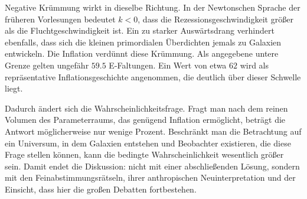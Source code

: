 Negative Krümmung wirkt in dieselbe Richtung. In der Newtonschen Sprache der früheren Vorlesungen bedeutet \(k<0\), dass die Rezessionsgeschwindigkeit größer als die Fluchtgeschwindigkeit ist. Ein zu starker Auswärtsdrang verhindert ebenfalls, dass sich die kleinen primordialen Überdichten jemals zu Galaxien entwickeln. Die Inflation verdünnt diese Krümmung. Als angegebene untere Grenze gelten ungefähr \(59.5\) E-Faltungen. Ein Wert von etwa \(62\) wird als repräsentative Inflationsgeschichte angenommen, die deutlich über dieser Schwelle liegt.

Dadurch ändert sich die Wahrscheinlichkeitsfrage. Fragt man nach dem reinen Volumen des Parameterraums, das genügend Inflation ermöglicht, beträgt die Antwort möglicherweise nur wenige Prozent. Beschränkt man die Betrachtung auf ein Universum, in dem Galaxien entstehen und Beobachter existieren, die diese Frage stellen können, kann die bedingte Wahrscheinlichkeit wesentlich größer sein. Damit endet die Diskussion: nicht mit einer abschließenden Lösung, sondern mit den Feinabstimmungsrätseln, ihrer anthropischen Neuinterpretation und der Einsicht, dass hier die großen Debatten fortbestehen.
